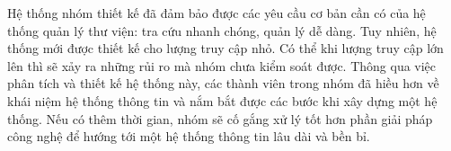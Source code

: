 \documentclass[../report.tex]{subfiles}
\begin{document}
Hệ thống nhóm thiết kế đã đảm bảo được các yêu cầu cơ bản cần có của hệ thống quản lý thư viện: tra cứu nhanh chóng, quản lý dễ dàng. Tuy nhiên, hệ thống mới được thiết kế cho lượng truy cập nhỏ. Có thể khi lượng truy cập lớn lên thì sẽ xảy ra những rủi ro mà nhóm chưa kiểm soát được. 
\newline
Thông qua việc phân tích và thiết kế hệ thống này, các thành viên trong nhóm đã hiều hơn về khái niệm hệ thống thông tin và nắm bắt được các bước khi xây dựng một hệ thống. Nếu có thêm thời gian, nhóm sẽ cố gắng xử lý tốt hơn phần giải pháp công nghệ để hướng tới một hệ thống thông tin lâu dài và bền bỉ.
\end{document}
